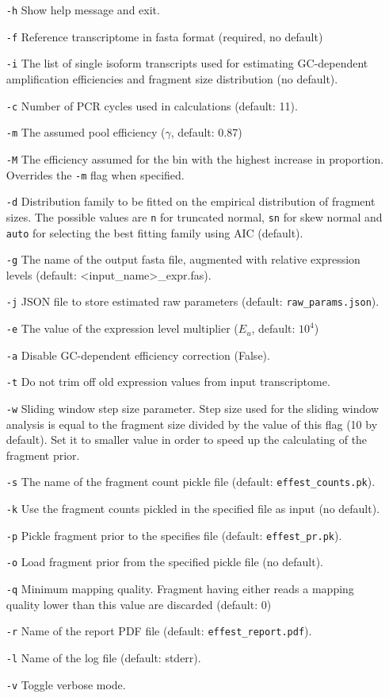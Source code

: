 \begin{itemize}
    \item[\texttt{-h}]{Show help message and exit.}
    \item[\texttt{-f}]{Reference transcriptome in fasta format (required, no default)}
    \item[\texttt{-i}]{The list of single isoform transcripts used for estimating GC-dependent amplification efficiencies and fragment size distribution (no default).}
    \item[\texttt{-c}]{Number of PCR cycles used in calculations (default: 11).}
    \item[\texttt{-m}]{The assumed pool efficiency ($\gamma$, default: 0.87)}
    \item[\texttt{-M}]{The efficiency assumed for the bin with the highest increase in proportion. Overrides the \texttt{-m} flag when specified.}
    \item[\texttt{-d}]{Distribution family to be fitted on the empirical distribution of fragment sizes. The possible values are \texttt{n} for truncated normal, \texttt{sn} for skew normal and \texttt{auto} for selecting the best fitting family using AIC (default).}
    \item[\texttt{-g}]{The name of the output fasta file, augmented with relative expression levels (default: <input\_name>\_expr.fas).}
    \item[\texttt{-j}]{JSON file to store estimated raw parameters (default: \texttt{raw\_params.json}).}
    \item[\texttt{-e}]{The value of the expression level multiplier ($E_u$, default: $10^4$)}
    \item[\texttt{-a}]{Disable GC-dependent efficiency correction (False).}
    \item[\texttt{-t}]{Do not trim off old expression values from input transcriptome.}
    \item[\texttt{-w}]{Sliding window step size parameter. Step size used for the sliding window analysis is equal to the fragment size divided by the value of this flag (10 by default). Set it to smaller value in order to speed up the calculating of the fragment prior.}
    \item[\texttt{-s}]{The name of the fragment count pickle file (default: \texttt{effest\_counts.pk}).}
    \item[\texttt{-k}]{Use the fragment counts pickled in the specified file as input (no default).}
    \item[\texttt{-p}]{Pickle fragment prior to the specifies file (default: \texttt{effest\_pr.pk}).}
    \item[\texttt{-o}]{Load fragment prior from the specified pickle file (no default).}
    \item[\texttt{-q}]{Minimum mapping quality. Fragment having either reads a mapping quality lower than this value are discarded (default: 0)}
    \item[\texttt{-r}]{Name of the report PDF file (default: \texttt{effest\_report.pdf}).}
    \item[\texttt{-l}]{Name of the log file (default: stderr).}
    \item[\texttt{-v}]{Toggle verbose mode.}
\end{itemize}

